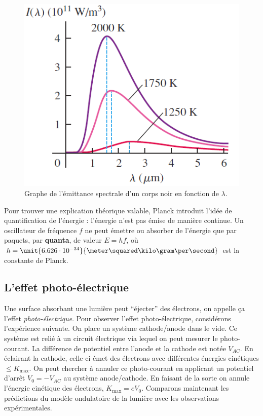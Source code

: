 \begin{figure}[ht]
	\centering
	\includegraphics[scale=0.65]{img/blackbody.png}
	\caption{Graphe de l'émittance spectrale d'un corps
	noir en fonction de $\lambda$.}
	\label{fig:blackbody}
\end{figure}

Pour trouver une explication théorique valable, Planck
introduit l'idée de quantification de l'énergie :
l'énergie n'est pas émise de manière continue.
Un oscillateur de fréquence $f$ ne peut émettre
ou absorber de l'énergie que par paquets, par \textbf{quanta},
de valeur $E = hf$, où $h = \unit{6.626\cdot10^{-34}}{\meter\squared\kilo\gram\per\second}$
est la constante de Planck.

\subsection{L'effet photo-électrique}
Une surface absorbant une lumière peut ``éjecter'' des électrons,
on appelle ça l'effet \emph{photo-électrique}.
Pour observer l'effet photo-électrique, considérons l'expérience
suivante. On place un système cathode/anode dans le vide. Ce système
est relié à un circuit électrique via lequel on peut mesurer le
photo-courant. La différence de potentiel entre l'anode et la
cathode est notée $V_{AC}$. En éclairant la cathode, celle-ci émet
des électrons avec différentes énergies cinétiques $\leq K_{\text{max}}$.
On peut chercher à annuler ce photo-courant en applicant un potentiel
d'arrêt $V_0 = -V_{AC}$ au système anode/cathode. En faisant de la sorte
on annule l'énergie cinétique des électrons, $K_{\text{max}} = eV_0$.
Comparons maintenant les prédictions du modèle ondulatoire de la lumière
avec les observations expérimentales.

